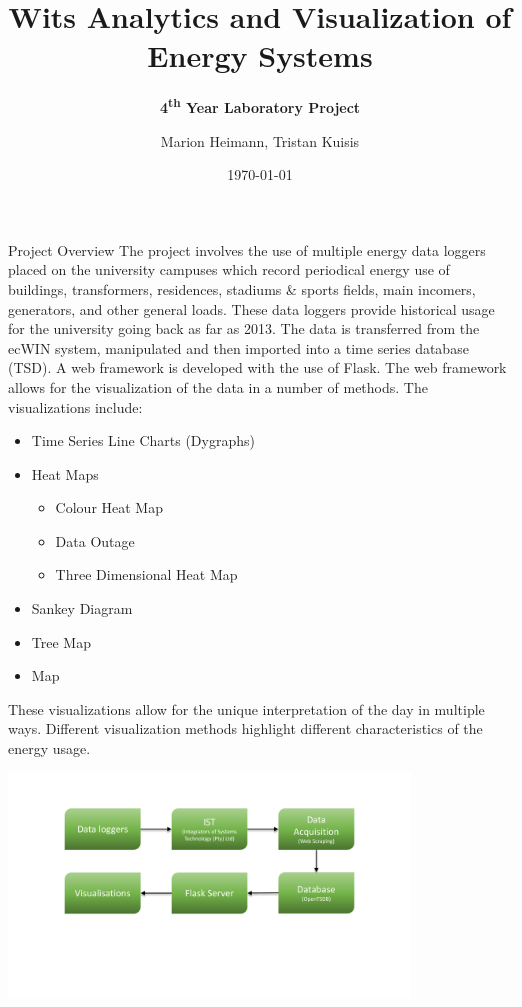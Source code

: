 \documentclass[8pt,xcolor={dvipsnames}]{beamer}
\title[] %
{ %
      \textbf{Wits Analytics and Visualization of Energy Systems}
}
\subtitle[Wits Analytics and Visualization of Energy Systems]
{
      \textbf{4\textsuperscript{th} Year Laboratory Project}
}
\author[Marion Heimann, Tristan Kuisis]
{      Marion Heimann, Tristan Kuisis 
}
\institute[]
{%
      School of Electrical and Information Engineering \\
      University of the Witwatersrand
}
\date{\today}
\begin{document}

{%

\begin{frame}{Project Overview}
The project involves the use of multiple energy data loggers placed on the university campuses which record periodical energy use of buildings, transformers, residences, stadiums \& sports fields, main incomers, generators, and other general loads. These data loggers provide historical usage for the university going back as far as 2013. The data is transferred from the ecWIN system, manipulated and then imported into a time series database (TSD). A web framework is developed with the use of Flask.
The web framework allows for the visualization of the data in a number of methods.
The visualizations include:

\begin{itemize}
	\item Time Series Line Charts (Dygraphs)
	\item Heat Maps
	\begin{itemize}
		\item Colour Heat Map
		\item Data Outage
		\item Three Dimensional Heat Map
	\end{itemize}
	\item Sankey Diagram
	\item Tree Map
	\item Map
	
\end{itemize}


These visualizations allow for the unique interpretation of the day in multiple ways. Different visualization methods highlight different characteristics of the energy usage.

\begin{center}
	
	\begin{center}
		\includegraphics[width=0.8\textwidth, trim=135 200 135 80, clip]{SystemOverviewGreen}
	\end{center}
\end{center}
\end{frame}


}
\end{document}
